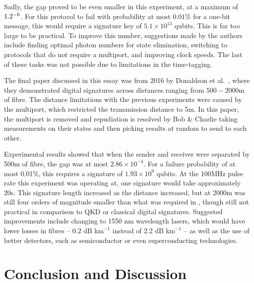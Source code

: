\documentclass[%
 reprint,
 amsmath,amssymb,
 aps,
 pra,
]{revtex4-1}
\begin{document}
Sadly, the gap proved to be even smaller in this experiment, at a maximum of $1.2 \time 10^{-6}$. For this protocol to fail with probability at most $0.01\%$ for a one-bit message, this would require a signature key of $5.1 \times 10^{13}$ qubits. This is far too large to be practical. To improve this number, suggestions made by the authors include finding optimal photon numbers for state elimination, switching to protocols that do not require a multiport, and improving clock speeds. The last of these tasks was not possible due to limitations in the time-tagging.

The final paper discussed in this essay was from 2016 by Donaldson et al.\ \cite{PhysRevA.93.012329}, where they demonstrated digital signatures across distances ranging from $500-2000\text{m}$ of fibre. The distance limitations with the previous experiments were caused by the multiport, which restricted the transmission distance to 5m. In this paper, the multiport is removed and repudiation is resolved by Bob \& Charlie taking measurements on their states and then picking results at random to send to each other.

Experimental results showed that when the sender and receiver were separated by 500m of fibre, the gap was at most $2.86 \times 10^{-4}$. For a failure probability of at most 0.01\%, this requires a signature of $1.93 \times 10^{9}$ qubits. At the 100MHz pulse rate this experiment was operating at, one signature would take approximately 20s. This signature length increased as the distance increased, but at 2000m was still four orders of magnitude smaller than what was required in \cite{PhysRevLett.113.040502}, though still not practical in comparison to QKD or classical digital signatures. Suggested improvements include changing to 1550 nm wavelength lasers, which would have lower losses in fibres -- $0.2\text{ dB km}^{-1}$ instead of $2.2\text{ dB km}^{-1}$ -- as well as the use of better detectors, such as semiconductor \cite{0957-0233-21-1-012002} or even superconducting \cite{0953-2048-25-6-063001} technologies.

\section{Conclusion and Discussion}
\label{sec:conclusion}


\appendix
\end{document}
